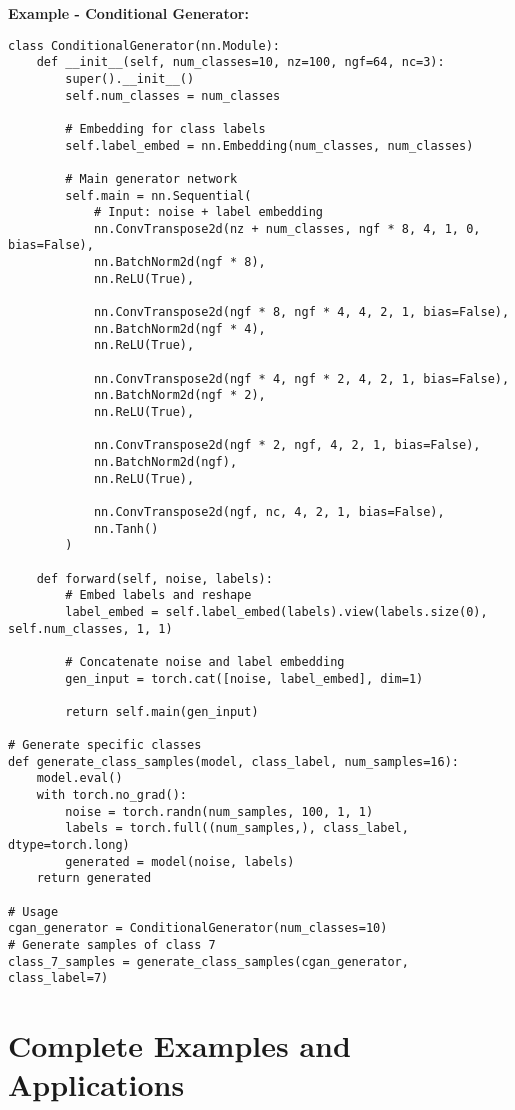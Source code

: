 \documentclass[11pt,a4paper]{book}
\begin{document}
\textbf{Example - Conditional Generator:}
\begin{verbatim}
class ConditionalGenerator(nn.Module):
    def __init__(self, num_classes=10, nz=100, ngf=64, nc=3):
        super().__init__()
        self.num_classes = num_classes
        
        # Embedding for class labels
        self.label_embed = nn.Embedding(num_classes, num_classes)
        
        # Main generator network
        self.main = nn.Sequential(
            # Input: noise + label embedding
            nn.ConvTranspose2d(nz + num_classes, ngf * 8, 4, 1, 0, bias=False),
            nn.BatchNorm2d(ngf * 8),
            nn.ReLU(True),
            
            nn.ConvTranspose2d(ngf * 8, ngf * 4, 4, 2, 1, bias=False),
            nn.BatchNorm2d(ngf * 4),
            nn.ReLU(True),
            
            nn.ConvTranspose2d(ngf * 4, ngf * 2, 4, 2, 1, bias=False),
            nn.BatchNorm2d(ngf * 2),
            nn.ReLU(True),
            
            nn.ConvTranspose2d(ngf * 2, ngf, 4, 2, 1, bias=False),
            nn.BatchNorm2d(ngf),
            nn.ReLU(True),
            
            nn.ConvTranspose2d(ngf, nc, 4, 2, 1, bias=False),
            nn.Tanh()
        )
    
    def forward(self, noise, labels):
        # Embed labels and reshape
        label_embed = self.label_embed(labels).view(labels.size(0), self.num_classes, 1, 1)
        
        # Concatenate noise and label embedding
        gen_input = torch.cat([noise, label_embed], dim=1)
        
        return self.main(gen_input)

# Generate specific classes
def generate_class_samples(model, class_label, num_samples=16):
    model.eval()
    with torch.no_grad():
        noise = torch.randn(num_samples, 100, 1, 1)
        labels = torch.full((num_samples,), class_label, dtype=torch.long)
        generated = model(noise, labels)
    return generated

# Usage
cgan_generator = ConditionalGenerator(num_classes=10)
# Generate samples of class 7
class_7_samples = generate_class_samples(cgan_generator, class_label=7)
\end{verbatim}

\chapter{Complete Examples and Applications}
\end{document}
